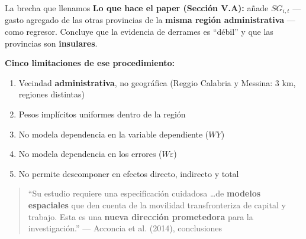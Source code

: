 \documentclass[
  10pt,
  ignorenonframetext,
  aspectratio=169,
  spanish,
]{beamer}
\providecommand{\tightlist}{%
  \setlength{\itemsep}{0pt}\setlength{\parskip}{0pt}}
\begin{document}
\begin{frame}{La brecha que llenamos}
\protect{}\label{la-brecha-que-llenamos}
\textbf{Lo que hace el paper (Sección V.A):} añade \(SG_{i,t}\) ---
gasto agregado de las otras provincias de la \textbf{misma región
administrativa} --- como regresor. Concluye que la evidencia de derrames
es ``débil'' y que las provincias son \textbf{insulares}.

\vspace{0.3cm}

\textbf{Cinco limitaciones de ese procedimiento:}

\small

\begin{enumerate}
\tightlist
\item
  Vecindad \textbf{administrativa}, no geográfica (Reggio Calabria y
  Messina: 3 km, regiones distintas)
\item
  Pesos implícitos uniformes dentro de la región
\item
  No modela dependencia en la variable dependiente (\(WY\))
\item
  No modela dependencia en los errores (\(W\varepsilon\))
\item
  No permite descomponer en efectos directo, indirecto y total
\end{enumerate}

\normalsize

\vspace{0.3cm}

\begin{quotation}
\small
``Su estudio requiere una especificación cuidadosa \dots de \textbf{modelos espaciales} que den cuenta de la movilidad transfronteriza de capital y trabajo. Esta es una \textbf{nueva dirección prometedora} para la investigación.''
\hfill --- Acconcia et al. (2014), conclusiones
\end{quotation}
\end{frame}
\end{document}
